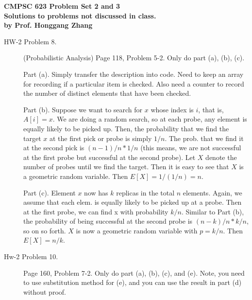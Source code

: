\documentclass[11pt]{article}
\begin{document}

\begin{center}
{\bf CMPSC 623 Problem Set 2 and 3} \\
{\bf Solutions to problems not discussed in class.}\\
{\bf by Prof. Honggang Zhang} \\
\end{center}


\begin{description}



\item[HW-2 Problem 8.]
(Probabilistic Analysis) Page 118, Problem 5-2. Only do part (a), (b), (c).

Part (a). Simply transfer the description into code. Need to keep
an array for recording if a particular item is checked. Also need
a counter to record the number of distinct elements that have been
checked.

Part (b). Suppose we want to search for $x$ whose index is $i$,
that is, $A[i]=x$. We are doing a random search, so at each probe,
any element is equally likely to be picked up. Then, the
probability that we find the target $x$ at the first pick or probe
is simply $1/n$. The prob. that we find it at the second pick is
$(n-1)/n * 1/n$ (this means, we are not successful at the first
probe but successful at the second probe). Let $X$ denote the
number of probes until we find the target. Then it is easy to see
that $X$ is a geometric random variable. Then $E[X]=1/(1/n)=n$.

Part (c). Element $x$ now has $k$ replicas in the total $n$
elements. Again, we assume that each elem. is equally likely to be
picked up at a probe. Then at the first probe, we can find x with
probability $k/n$. Similar to Part (b), the probability of being
successful at the second probe is $(n-k)/n * k/n$, so on so forth.
$X$ is now a geometric random variable with $p=k/n$. Then
$E[X]=n/k$.

\item[Hw-2 Problem 10.] Page 160, Problem 7-2. Only do part (a), (b), (c), and (e). Note, you need to
use substitution method for (e), and you can use the result in
part (d) without proof.


\end{description}
\end{document}
